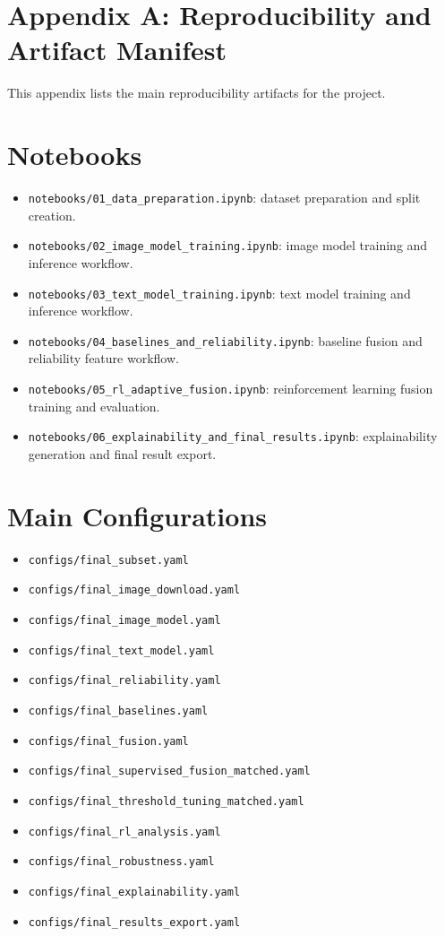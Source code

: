 \section*{Appendix A: Reproducibility and Artifact Manifest}


This appendix lists the main reproducibility artifacts for the project.


\section{Notebooks}


\begin{itemize}
\item \texttt{notebooks/01\_data\_preparation.ipynb}: dataset preparation and split creation.
\item \texttt{notebooks/02\_image\_model\_training.ipynb}: image model training and inference workflow.
\item \texttt{notebooks/03\_text\_model\_training.ipynb}: text model training and inference workflow.
\item \texttt{notebooks/04\_baselines\_and\_reliability.ipynb}: baseline fusion and reliability feature workflow.
\item \texttt{notebooks/05\_rl\_adaptive\_fusion.ipynb}: reinforcement learning fusion training and evaluation.
\item \texttt{notebooks/06\_explainability\_and\_final\_results.ipynb}: explainability generation and final result export.
\end{itemize}


\section{Main Configurations}


\begin{itemize}
\item \texttt{configs/final\_subset.yaml}
\item \texttt{configs/final\_image\_download.yaml}
\item \texttt{configs/final\_image\_model.yaml}
\item \texttt{configs/final\_text\_model.yaml}
\item \texttt{configs/final\_reliability.yaml}
\item \texttt{configs/final\_baselines.yaml}
\item \texttt{configs/final\_fusion.yaml}
\item \texttt{configs/final\_supervised\_fusion\_matched.yaml}
\item \texttt{configs/final\_threshold\_tuning\_matched.yaml}
\item \texttt{configs/final\_rl\_analysis.yaml}
\item \texttt{configs/final\_robustness.yaml}
\item \texttt{configs/final\_explainability.yaml}
\item \texttt{configs/final\_results\_export.yaml}
\end{itemize}


